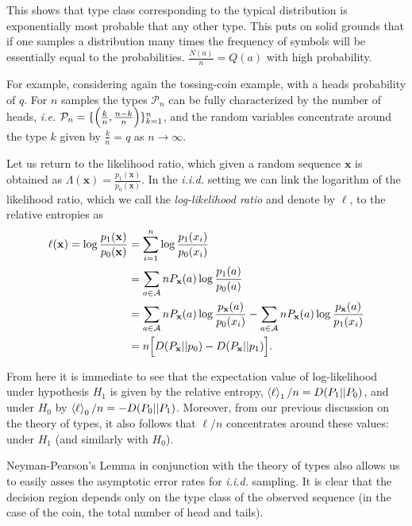 This shows that type class corresponding to the typical distribution is exponentially most probable that any other type. This puts on solid grounds that if one samples a distribution many times the frequency of symbols  will be essentially equal to the probabilities. $\frac{N(a)}{n}=Q(a)$ with high probability.

For example, considering again the tossing-coin example, with a heads probability of $q$. For $n$ samples the types $\mathcal{P}_n$ can be fully characterized by the number of heads, \textit{i.e.} $\mathcal{P}_n = \lbrace \Big(\frac{k}{n}, \frac{n-k}{n}\Big)\rbrace_{k=1}^n$, and the random variables concentrate around the type $k$ given by $\frac{k}{n} = q$ as $n\to\infty$.

\vspace{1cm}
Let us return to the likelihood ratio, which given a random sequence $\mathbf{x}$ is obtained as $\Lambda(\mathbf{x})=\frac{p_1(\mathbf{x})}{p_0(\mathbf{x})}$. In the \textit{i.i.d.} setting we can link the logarithm of the likelihood ratio, which we call the \textit{log-likelihood ratio} and denote by $\ell$, to the relative entropies as
\begin{align}\label{eq:loglikiid}
\ell(\mathbf{x}) = \log{\frac{p_1(\mathbf{x})}{p_0(\mathbf{x})}} &= \sum_{i=1}^n \log{\frac{p_1(x_i)}{p_0(x_i)}} \\ &= \sum_{a\in\mathcal{A}} n P_{\mathbf{x}}(a) \log{\frac{p_1(a)}{p_0(a)}} \\ \nonumber
&= \sum_{a\in\mathcal{A}} n P_{\mathbf{x}}(a) \log{\frac{p_{\mathbf{x}}(a)}{p_0(x_i)} - \sum_{a\in\mathcal{A}} n P_{\mathbf{x}}(a) \log{\frac{p_{\mathbf{x}}(a)}{p_1(x_i)}}} \\ \nonumber
&= n \Big[ D(P_{\mathbf{x}}||p_0) - D(P_{\mathbf{x}}||p_1) \Big] \nonumber.
\end{align}

From here it is immediate to see that the expectation value of log-likelihood under hypothesis
$H_1$ is given by the relative entropy, $\mathinner{\langle \ell\rangle}_{1}/n=D(P_1||P_0)$, and under $H_{0}$
 by $\mathinner{\langle \ell\rangle}_{0}/n=- D(P_0||P_1)$. Moreover, from our previous discussion on the theory of types, it also follows that $\ell/n$ concentrates around these values:
under $H_{1}$ (and similarly with $H_0$).

Neyman-Pearson's Lemma in conjunction with the theory of types also allows us to easily asses the asymptotic error rates for  \textit{i.i.d.} sampling. It is clear that the decision region depends only on the type class of the observed sequence (in the case of the coin, the total number of head and tails).

